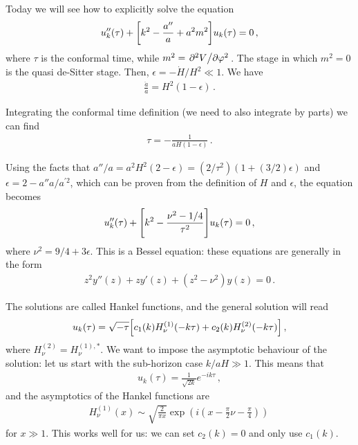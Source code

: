 \documentclass[main.tex]{subfiles}
\begin{document}

Today we will see how to explicitly solve the equation 
%
\begin{align}
u''_k (\tau )
+ 
\qty[k^2 - \frac{a''}{a} + a^2 m^2] u_k (\tau ) = 0
\,,
\end{align}
%
where \(\tau \) is the conformal time, while \(m^2 = \pdv*[2]{V}{\varphi }\). 
The stage in which \(m^2 = 0\) is the quasi de-Sitter stage. 
Then, \(\epsilon = - \dot{H} / H^2 \ll 1\). 
We have 
%
\begin{align}
\frac{\ddot{a}}{a} = H^2 ( 1- \epsilon )
\,.
\end{align}

Integrating the conformal time definition (we need to also integrate by parts) we can find 
%
\begin{align}
\tau = - \frac{1}{a H (1 - \epsilon )}
\,.
\end{align}

Using the facts that \(a'' / a = a^2 H^2 (2- \epsilon ) = (2 /\tau^2) (1 + (3/2) \epsilon )\) and \(\epsilon = 2 - a'' a / a^{\prime 2}\), which can be proven from the definition of \(H\) and \(\epsilon \), the equation becomes 
%
\begin{align}
u''_k(\tau ) + \qty[k^2 - \frac{\nu^2 - 1/4}{\tau^2}] u_k (\tau )= 0 
\,,
\end{align}
%
where \(\nu^2 = 9/4 + 3 \epsilon \). 
This is a Bessel equation: these equations are generally in the form 
%
\begin{align}
z^2 y'' (z) + z y' (z) + (z^2 - \nu^2) y(z) = 0
\,.
\end{align}

The solutions are called Hankel functions, and the general solution will read 
%
\begin{align}
u_k (\tau ) = \sqrt{- \tau } \qty[ c_1 (k) H_\nu^{(1)} (-k\tau ) + c_2 (k) H_\nu^{(2)} (-k\tau )]
\,,
\end{align}
%
where \(H^{(2)}_\nu = H^{(1), *}_\nu\). 
We want to impose the asymptotic behaviour of the solution: let us start with the sub-horizon case \(k / aH \gg 1\). 
This means that 
%
\begin{align}
u_k (\tau ) = \frac{1}{\sqrt{2k}} e^{-ik \tau }
\,,
\end{align}
%
and the asymptotics of the Hankel functions are
%
\begin{align}
H^{(1)}_\nu  (x) \sim \sqrt{ \frac{2}{\pi x}} \exp(i (x - \frac{\pi}{2} \nu - \frac{\pi}{4}))
\,
\end{align}
%
for \(x \gg 1\). This works well for us: we can set \(c_2 (k) = 0\) and only use \(c_1 (k)\). 
\end{document}
